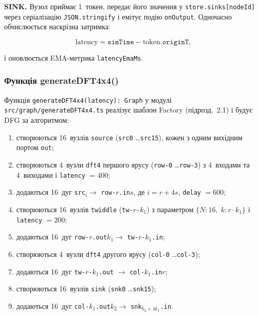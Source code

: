 \textbf{SINK.} Вузол приймає 1~токен, передає його значення у
\texttt{store.sinks[nodeId]} через серіалізацію
\texttt{JSON.stringify} і емітує подію \texttt{onOutput}.
Одночасно обчислюється наскрізна затримка:

\begin{equation}
  \mathrm{latency} = \texttt{simTime} - \mathrm{token}.\texttt{originT},
  \label{eq:lat_calc}
\end{equation}

і оновлюється EMA-метрика \texttt{latencyEmaMs}.

\subsubsection*{Функція generateDFT4x4()}

Функція \texttt{generateDFT4x4(latency): Graph} у модулі
\texttt{src/graph/\allowbreak generateDFT4x4.ts} реалізує шаблон Factory
(підрозд.~2.1) і будує DFG за алгоритмом:

\begin{enumerate}
  \item створюються 16~вузлів \texttt{source}
        (\texttt{src0} \ldots \texttt{src15}), кожен з одним
        вихідним портом \texttt{out};
  \item створюються 4~вузли \texttt{dft4} першого ярусу
        (\texttt{row-0} \ldots \texttt{row-3}) з 4~входами та
        4~виходами і \texttt{latency} $= 400$;
  \item додаються 16~дуг \texttt{src}$_i \to$
        \texttt{row-}$r$\texttt{.in}$s$, де $i = r + 4s$,
        \texttt{delay} $= 600$;
  \item створюються 16~вузлів \texttt{twiddle}
        (\texttt{tw-}$r$\texttt{-}$k_1$) з параметром
        $\{N: 16,\; k: r \cdot k_1\}$ і \texttt{latency} $= 200$;
  \item додаються 16~дуг \texttt{row-}$r$\texttt{.out}$k_1 \to$
        \texttt{tw-}$r$\texttt{-}$k_1$\texttt{.in};
  \item створюються 4~вузли \texttt{dft4} другого ярусу
        (\texttt{col-0} \ldots \texttt{col-3});
  \item додаються 16~дуг \texttt{tw-}$r$\texttt{-}$k_1$\texttt{.out}
        $\to$ \texttt{col-}$k_1$\texttt{.in}$r$;
  \item створюються 16~вузлів \texttt{sink}
        (\texttt{snk0} \ldots \texttt{snk15});
  \item додаються 16~дуг \texttt{col-}$k_1$\texttt{.out}$k_2 \to$
        \texttt{snk}$_{k_2 + 4 k_1}$\texttt{.in}.
\end{enumerate}

